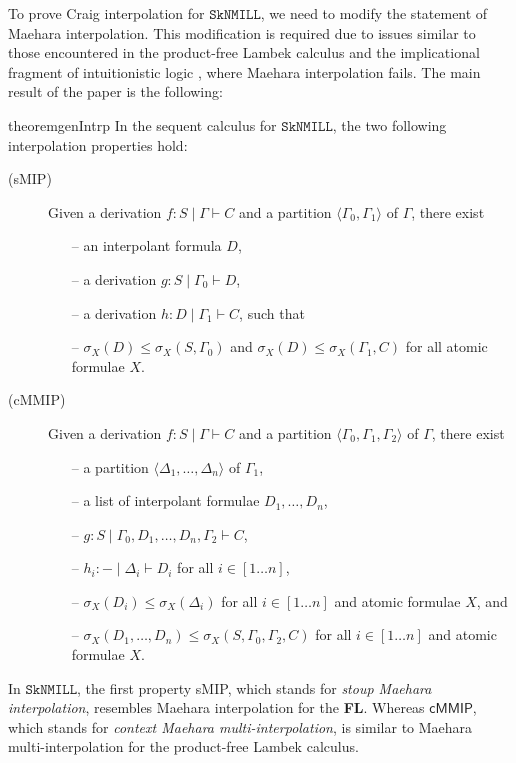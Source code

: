 \documentclass[sn-mathphys-num]{sn-jnl}%
\newcommand{\GG}{\Gamma}
\newcommand{\GD}{\Delta}
\newcommand{\vd}{\vdash}
\newcommand{\SkNMILL}{$\mathtt{SkNMILL}$}
\newcommand{\gs}[1]{\sigma_{X} (#1)}
\newcommand{\FL}{\textbf{FL}}
\newcommand{\sMIP}{\textsf{sMIP}}
\newcommand{\cMMIP}{\textsf{cMMIP}}
\theoremstyle{thmstyleone}%
\theoremstyle{thmstyletwo}%
\theoremstyle{thmstylethree}%
\begin{document}
To prove Craig interpolation for \SkNMILL, we need to modify the statement of Maehara interpolation.
This modification is required due to issues similar to those encountered in the product-free Lambek calculus \cite{Pentus1997} and the implicational fragment of intuitionistic logic \cite{Kanazawa2006}, where Maehara interpolation fails. The main result of the paper is the following:
\begin{restatable*}{theorem}{genIntrp}\label{genIntrp}
In the sequent calculus for \SkNMILL, the two following interpolation properties hold:
\begin{description}
\item[(\sMIP)] Given a derivation $f: S \mid \Gamma \vd C$ and a partition $\langle \GG_0,\GG_1 \rangle$ of $\GG$, there exist
\begin{itemize}
  \item[--] an interpolant formula $D$,
  \item[--] a derivation $g : S \mid \GG_0 \vd D$,
  \item[--] a derivation $h : D \mid \GG_1 \vd C$, such that
  \item[--] $\gs{D} \leq \gs{S , \GG_0}$ and $\gs{D} \leq \gs{\GG_1 , C}$ for all atomic formulae $X$.
\end{itemize}
\item[(\cMMIP)] Given a derivation $f: S \mid \Gamma \vd C$ and a partition $\langle \GG_0,\GG_1, \GG_2 \rangle$ of $\GG$, there exist  
  \begin{itemize}
    \item[--] a partition $\langle \GD_1, \dots, \GD_n \rangle$ of $\GG_1$,
    \item[--] a list of interpolant formulae $D_1, \dots, D_n$,
    \item[--] $g: S \mid \GG_0, D_1, \dots, D_n, \GG_2 \vd C$,
    \item[--] $h_i : {-} \mid \GD_i \vd D_i$ for  all $i \in [1\dots n]$,
    \item[--] $\gs{D_i} \leq \gs{\GD_i}$ for all $i \in [1 \dots n]$ and atomic formulae $X$, and
    \item[--] $\gs{D_1, \dots, D_n} \leq \gs{S, \GG_0, \GG_2, C}$ for all $i \in [1 \dots n]$ and atomic formulae $X$.
  \end{itemize}
\end{description}
\end{restatable*}
In \SkNMILL, the first property \sMIP, which stands for \emph{stoup Maehara interpolation}, resembles Maehara interpolation for the \FL. Whereas $\cMMIP$, which stands for \emph{context Maehara multi-interpolation}, is similar to Maehara multi-interpolation for the product-free Lambek calculus. %
\end{document}
